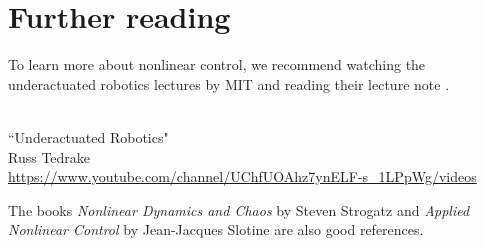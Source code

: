 \section{Further reading}

To learn more about nonlinear control, we recommend watching the underactuated
robotics lectures by MIT and reading their lecture note
\cite{bib:underactuated_book}.
\begin{bookfigure}
   \\
  ``Underactuated Robotics" \\
  \footnotesize Russ Tedrake \\
  \url{https://www.youtube.com/channel/UChfUOAhz7ynELF-s_1LPpWg/videos}
\end{bookfigure}

The books \textit{Nonlinear Dynamics and Chaos} by Steven Strogatz and
\textit{Applied Nonlinear Control} by Jean-Jacques Slotine are also good
references.
